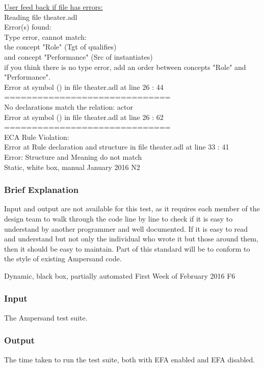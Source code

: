 \documentclass[12pt]{report}
\begin{document}
\noindent
\underline{User feed back if file has errors:} \\
Reading file theater.adl \\
Error(s) found:\\
Type error, cannot match:\\
the concept "Role" (Tgt of qualifies)\\
and concept "Performance" (Src of instantiates)\\
if you think there is no type error, add an order between concepts "Role" and 
"Performance".\\
Error at symbol () in file theater.adl at line 26 : 44 \\
============================== \\
No declarations match the relation: actor\\
Error at symbol () in file theater.adl at line 26 : 62\\
==============================\\
ECA Rule Violation: \\
Error at Rule declaration and structure in file theater.adl at line 33 : 41\\
Error: Structure and Meaning do not match\\

{Static, white box, manual}
{January 2016}
{N2}
\vspace{-12pt}\subsubsection*{Brief Explanation}
Input and output are not available for this test, as it requires each member of
the design team to walk through the code line by line to check if it is easy to
understand by another programmer and well documented. If it is easy to read and
understand but not only the individual who wrote it but those around them, then
it should be easy to maintain. Part of this standard will be to conform to the
style of existing Ampersand code.

{Dynamic, black box, partially automated}
{First Week of February 2016 }
{F6}
\vspace{-12pt}\subsubsection*{Input}
The Ampersand test suite. 

\vspace{-12pt}\subsubsection*{Output}
The time taken to run the test suite, both with EFA enabled and EFA disabled.
\end{document}
